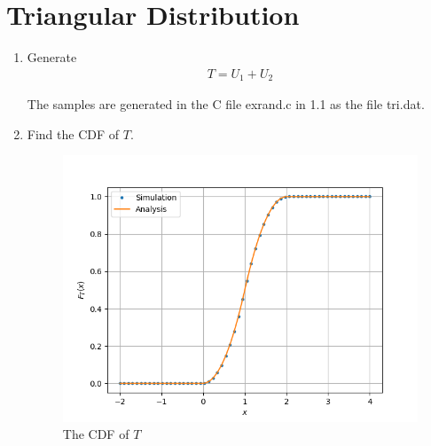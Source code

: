 \documentclass[journal,12pt,twocolumn]{IEEEtran}
\renewcommand\thesection{\arabic{section}}
\begin{document}
\section{Triangular Distribution}
\begin{enumerate}[label=\thesection.\arabic*
,ref=\thesection.\theenumi]
\item Generate
	\begin{align}
		T = U_1 + U_2
	\end{align}

\solution
The samples are generated in the C file exrand.c in 1.1 as the file tri.dat.

\item Find the CDF of $T$.
	\begin{figure}
		\includegraphics[width=\columnwidth]{figs/4_2.png}
		\caption{The CDF of $T$}
		\label{fig:tri-cdf}
	\end{figure}


\end{enumerate}
\end{document}
